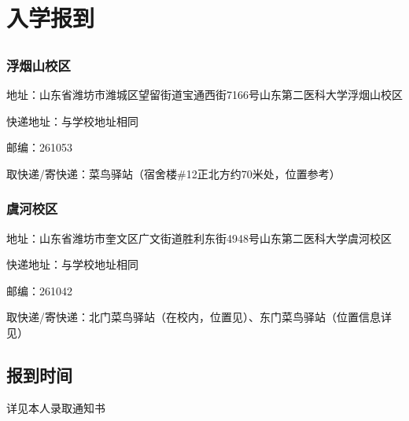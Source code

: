 \section[入学报到]{入学报到}

\subsection[地址与快递]{}
\subsubsection[浮烟山校区]{浮烟山校区}
地址：山东省潍坊市潍城区望留街道宝通西街7166号山东第二医科大学浮烟山校区

快递地址：与学校地址相同

邮编：261053

取快递/寄快递：菜鸟驿站（宿舍楼\#12正北方约70米处，位置参考）\footnotemark
{}

\subsubsection[虞河校区]{虞河校区}
地址：山东省潍坊市奎文区广文街道胜利东街4948号山东第二医科大学虞河校区

快递地址：与学校地址相同

邮编：261042

取快递/寄快递：北门菜鸟驿站（在校内，位置见）、东门菜鸟驿站（位置信息详见）\footnotemark
{}

\subsection[报到时间]{报到时间}
详见本人录取通知书

